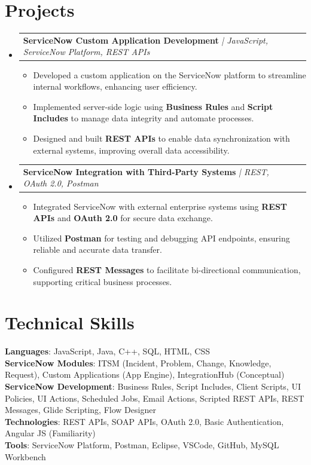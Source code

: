 \documentclass[letterpaper,11pt]{article}
\makeatletter
\newcommand{\resumeItem}[1]{
  \item\small{
    {#1 \vspace{-2pt}}
  }
}
\newcommand{\resumeProjectHeading}[2]{
    \item
    \begin{tabular*}{0.97\textwidth}{l@{\extracolsep{\fill}}r}
      \small#1 & #2 \\
    \end{tabular*}\vspace{-7pt}
}
\newcommand{\resumeSubHeadingListStart}{\begin{itemize}[leftmargin=0.15in, label={}]}
\newcommand{\resumeSubHeadingListEnd}{\end{itemize}}
\newcommand{\resumeItemListStart}{\begin{itemize}}
\newcommand{\resumeItemListEnd}{\end{itemize}\vspace{-5pt}}
\makeatother
\begin{document}
\section{Projects}
\resumeSubHeadingListStart
    \resumeProjectHeading
        {\textbf{ServiceNow Custom Application Development} \textit{| JavaScript, ServiceNow Platform, REST APIs}}{}
    \resumeItemListStart
        \resumeItem{Developed a custom application on the ServiceNow platform to streamline internal workflows, enhancing user efficiency.}
        \resumeItem{Implemented server-side logic using \textbf{Business Rules} and \textbf{Script Includes} to manage data integrity and automate processes.}
        \resumeItem{Designed and built \textbf{REST APIs} to enable data synchronization with external systems, improving overall data accessibility.}
    \resumeItemListEnd
    \resumeProjectHeading
        {\textbf{ServiceNow Integration with Third-Party Systems} \textit{| REST, OAuth 2.0, Postman}}{}
    \resumeItemListStart
        \resumeItem{Integrated ServiceNow with external enterprise systems using \textbf{REST APIs} and \textbf{OAuth 2.0} for secure data exchange.}
        \resumeItem{Utilized \textbf{Postman} for testing and debugging API endpoints, ensuring reliable and accurate data transfer.}
        \resumeItem{Configured \textbf{REST Messages} to facilitate bi-directional communication, supporting critical business processes.}
    \resumeItemListEnd
\resumeSubHeadingListEnd
\section{Technical Skills}
\begin{itemize}[leftmargin=0.15in, label={}]
    \small{\item{
        \textbf{Languages}{: JavaScript, Java, C++, SQL, HTML, CSS} \\
        \textbf{ServiceNow Modules}{: ITSM (Incident, Problem, Change, Knowledge, Request), Custom Applications (App Engine), IntegrationHub (Conceptual)} \\
        \textbf{ServiceNow Development}{: Business Rules, Script Includes, Client Scripts, UI Policies, UI Actions, Scheduled Jobs, Email Actions, Scripted REST APIs, REST Messages, Glide Scripting, Flow Designer} \\
        \textbf{Technologies}{: REST APIs, SOAP APIs, OAuth 2.0, Basic Authentication, Angular JS (Familiarity)} \\
        \textbf{Tools}{: ServiceNow Platform, Postman, Eclipse, VSCode, GitHub, MySQL Workbench}
    }}
\end{itemize}
\end{document}
